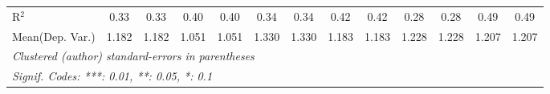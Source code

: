 \begin{tabular}{lcccccccccccc}
   R$^2$                                    & 0.33          & 0.33            & 0.40          & 0.40           & 0.34          & 0.34            & 0.42    & 0.42     & 0.28          & 0.28            & 0.49          & 0.49\\  
Mean(Dep. Var.) & 1.182 & 1.182 & 1.051 & 1.051 & 1.330 & 1.330 & 1.183 & 1.183 & 1.228 & 1.228 & 1.207 & 1.207 \\
   \midrule \midrule
   \multicolumn{13}{l}{\emph{Clustered (author) standard-errors in parentheses}}\\
   \multicolumn{13}{l}{\emph{Signif. Codes: ***: 0.01, **: 0.05, *: 0.1}}\\
\end{tabular}
\par\endgroup
